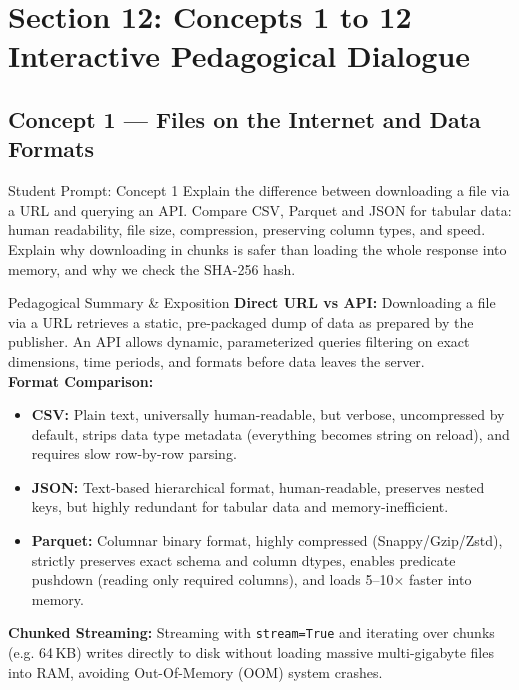 \documentclass[11pt,a4paper]{article}
\begin{document}
\newpage
\section{Section 12: Concepts 1 to 12 Interactive Pedagogical Dialogue}

\subsection{Concept 1 --- Files on the Internet and Data Formats}
\begin{promptbox}{Student Prompt: Concept 1}
Explain the difference between downloading a file via a URL and querying an API. Compare CSV, Parquet and JSON for tabular data: human readability, file size, compression, preserving column types, and speed. Explain why downloading in chunks is safer than loading the whole response into memory, and why we check the SHA-256 hash.
\end{promptbox}

\begin{evalbox}{Pedagogical Summary \& Exposition}
\textbf{Direct URL vs API:} Downloading a file via a URL retrieves a static, pre-packaged dump of data as prepared by the publisher. An API allows dynamic, parameterized queries filtering on exact dimensions, time periods, and formats before data leaves the server.\\
\textbf{Format Comparison:}
\begin{itemize}
    \item \textbf{CSV:} Plain text, universally human-readable, but verbose, uncompressed by default, strips data type metadata (everything becomes string on reload), and requires slow row-by-row parsing.
    \item \textbf{JSON:} Text-based hierarchical format, human-readable, preserves nested keys, but highly redundant for tabular data and memory-inefficient.
    \item \textbf{Parquet:} Columnar binary format, highly compressed (Snappy/Gzip/Zstd), strictly preserves exact schema and column dtypes, enables predicate pushdown (reading only required columns), and loads 5--10$\times$ faster into memory.
\end{itemize}
\textbf{Chunked Streaming:} Streaming with \texttt{stream=True} and iterating over chunks (e.g. 64\,KB) writes directly to disk without loading massive multi-gigabyte files into RAM, avoiding Out-Of-Memory (OOM) system crashes.
\end{evalbox}
\end{document}
